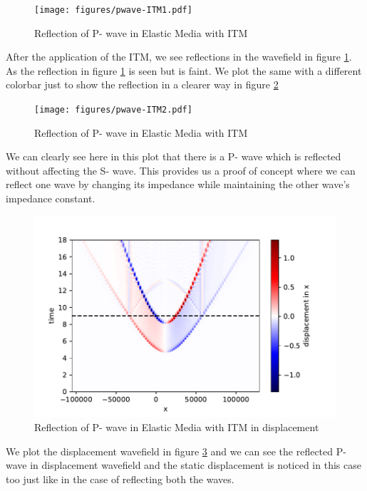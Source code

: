 \begin{figure}
    \centering
    \texttt{[image: figures/pwave-ITM1.pdf]}
    \caption{Reflection of P- wave in Elastic Media with \ac{ITM}}
    \label{fig:space-timeplot-pwave}
\end{figure}

After the application of the \ac{ITM}, we see reflections in the wavefield in figure \ref{fig:space-timeplot-pwave}.
As the reflection in figure \ref{fig:space-timeplot-pwave} is seen but is faint. We plot the same with a different colorbar just to show the reflection in a clearer
way in figure \ref{fig:space-timeplot-pwave2}

\begin{figure} %
    \centering
    \texttt{[image: figures/pwave-ITM2.pdf]}
    \caption{Reflection of P- wave in Elastic Media with \ac{ITM}}
    \label{fig:space-timeplot-pwave2}
\end{figure}

We can clearly see here in this plot that there is a P- wave which is reflected without affecting the S- wave. This provides us a proof of concept where we 
can reflect one wave by changing its impedance while maintaining the other wave's impedance constant. \\

\begin{figure} %
    \centering
    \includegraphics[width=0.75\linewidth]{figures/pwave-ITMdisplacement.pdf}
    \caption{Reflection of P- wave in Elastic Media with \ac{ITM} in displacement}
    \label{fig:space-timeplot-pwavedisplacement}
\end{figure}

We plot the displacement wavefield in figure \ref{fig:space-timeplot-pwavedisplacement} and we can see the reflected P- wave in displacement wavefield and the static
displacement is noticed in this case too just like in the case of reflecting both the waves. 

